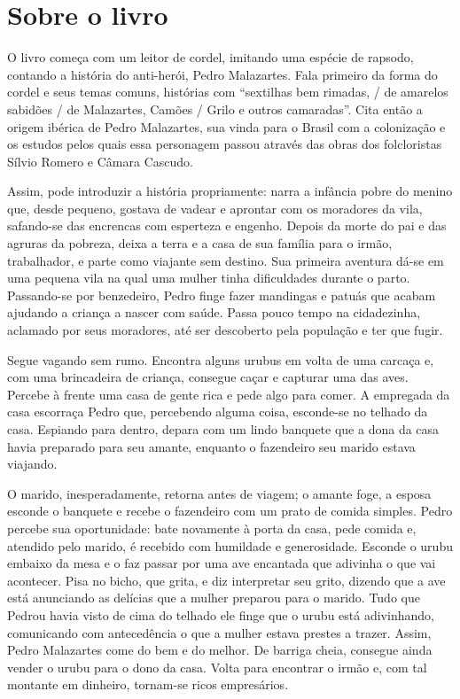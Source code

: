\documentclass[11pt]{extarticle}
\begin{document}

\section{Sobre o livro}
O livro começa com um leitor de cordel, imitando uma espécie de rapsodo, contando a história do anti-herói, Pedro Malazartes. Fala primeiro da forma do cordel e seus temas comuns, histórias com ``sextilhas bem rimadas, / de amarelos sabidões / de Malazartes, Camões / Grilo e outros camaradas''. Cita então a origem ibérica de Pedro Malazartes, sua vinda para o Brasil com a colonização e os estudos pelos quais essa personagem passou através das obras dos folcloristas Sílvio Romero e Câmara Cascudo.

Assim, pode introduzir a história propriamente: narra a infância pobre do menino que, desde pequeno, gostava de vadear e aprontar com os moradores da vila, safando-se das encrencas com esperteza e engenho.
Depois da morte do pai e das agruras da pobreza, deixa a terra e a casa de sua família para o irmão, trabalhador, e parte como viajante sem destino.
Sua primeira aventura dá-se em uma pequena vila na qual uma mulher tinha dificuldades durante o parto. Passando-se por benzedeiro, Pedro finge fazer mandingas e patuás que acabam ajudando a criança a nascer com saúde. Passa pouco tempo na cidadezinha, aclamado por seus moradores, até ser descoberto pela população e ter que fugir.

Segue vagando sem rumo. Encontra alguns urubus em volta de uma carcaça e, com uma brincadeira de criança, consegue caçar e capturar uma das aves. Percebe à frente uma casa de gente rica e pede algo para comer. A empregada da casa escorraça Pedro que, percebendo alguma coisa, esconde-se no telhado da casa. Espiando para dentro, depara com um lindo banquete que a dona da casa havia preparado para seu amante, enquanto o fazendeiro seu marido estava viajando. 

O marido, inesperadamente, retorna antes de viagem; o amante foge, a esposa esconde o banquete e recebe o fazendeiro com um prato de comida simples.
Pedro percebe sua oportunidade: bate novamente à porta da casa, pede comida e, atendido pelo marido, é recebido com humildade e generosidade. Esconde o urubu embaixo da mesa e o faz passar por uma ave encantada que adivinha o que vai acontecer. Pisa no bicho, que grita, e diz interpretar seu grito, dizendo que a ave está anunciando as delícias que a mulher preparou para o marido. Tudo que Pedrou havia visto de cima do telhado ele finge que o urubu está adivinhando, comunicando com antecedência o que a mulher estava prestes a trazer.
Assim, Pedro Malazartes come do bem e do melhor. De barriga cheia, consegue ainda vender o urubu para o dono da casa.
Volta para encontrar o irmão e, com tal montante em dinheiro, tornam-se ricos empresários.
\end{document}
